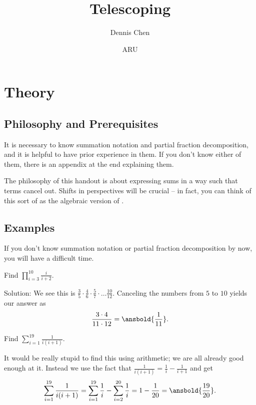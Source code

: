 \documentclass[mast]{lucky}
\title{Telescoping}
\author{Dennis Chen}
\date{ARU}
\begin{document}
\maketitle

\section{Theory}

\subsection{Philosophy and Prerequisites}

It is necessary to know summation notation and partial fraction decomposition, and it is helpful to have prior experience in them. If you don't know either of them, there is an appendix at the end explaining them.

The philosophy of this handout is about expressing sums in a way such that terms cancel out. Shifts in perspectives will be crucial -- in fact, you can think of this sort of as the algebraic version of .

\subsection{Examples}
If you don't know summation notation or partial fraction decomposition by now, you will have a difficult time.

\begin{exam}
Find $\prod\limits_{i=3}^{10}\frac{i}{i+2}.$
\end{exam}

\begin{sol}
Solution: We see this is $\frac{3}{5}\cdot \frac{4}{6}\cdot \frac{5}{7}\cdot \dots \frac{10}{12}.$ Canceling the numbers from $5$ to $10$ yields our answer as \[\frac{3\cdot 4}{11\cdot 12}=\ansbold{\frac{1}{11}}.\]
\end{sol}

\begin{exam}
Find $\sum\limits_{i=1}^{19} \frac{1}{i(i+1)}.$
\end{exam}

\begin{sol}
It would be really stupid to find this using arithmetic; we are all already good enough at it. Instead we use the fact that $\frac{1}{i(i+1)}=\frac{1}{i}-\frac{1}{i+1}$ and get \[\sum\limits_{i=1}^{19} \frac{1}{i(i+1)}=\sum\limits_{i=1}^{19} \frac{1}{i}-\sum\limits_{i=2}^{20}\frac{1}{i}=1-\frac{1}{20}=\ansbold{\frac{19}{20}}.\]
\end{sol}
\end{document}
